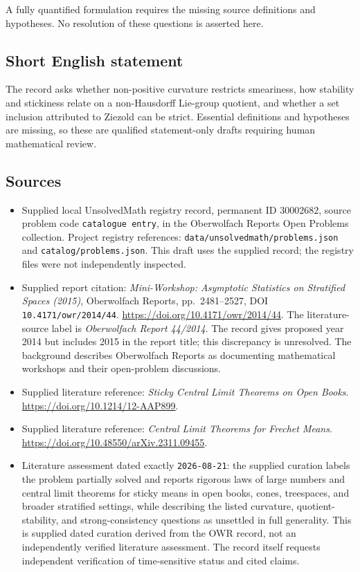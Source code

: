 \documentclass[11pt]{article}
\begin{document}
A fully quantified formulation requires the missing source definitions and hypotheses. No resolution of these questions is asserted here.
\subsection{Short English statement}
The record asks whether non-positive curvature restricts smeariness, how stability and stickiness relate on a non-Hausdorff Lie-group quotient, and whether a set inclusion attributed to Ziezold can be strict. Essential definitions and hypotheses are missing, so these are qualified statement-only drafts requiring human mathematical review.
\subsection{Sources}
\begin{itemize}
\item Supplied local UnsolvedMath registry record, permanent ID \(30002682\), source problem code \texttt{catalogue entry}, in the Oberwolfach Reports Open Problems collection. Project registry references: \texttt{data/unsolvedmath/problems.json} and \texttt{catalog/problems.json}. This draft uses the supplied record; the registry files were not independently inspected.
\item Supplied report citation: \emph{Mini-Workshop: Asymptotic Statistics on Stratified Spaces (2015)}, Oberwolfach Reports, pp.\ 2481--2527, DOI \texttt{10.4171/owr/2014/44}. \url{https://doi.org/10.4171/owr/2014/44}. The literature-source label is \emph{Oberwolfach Report 44/2014}. The record gives proposed year 2014 but includes 2015 in the report title; this discrepancy is unresolved. The background describes Oberwolfach Reports as documenting mathematical workshops and their open-problem discussions.
\item Supplied literature reference: \emph{Sticky Central Limit Theorems on Open Books}. \url{https://doi.org/10.1214/12-AAP899}.
\item Supplied literature reference: \emph{Central Limit Theorems for Frechet Means}. \url{https://doi.org/10.48550/arXiv.2311.09455}.
\item Literature assessment dated exactly \texttt{2026-08-21}: the supplied curation labels the problem partially solved and reports rigorous laws of large numbers and central limit theorems for sticky means in open books, cones, treespaces, and broader stratified settings, while describing the listed curvature, quotient-stability, and strong-consistency questions as unsettled in full generality. This is supplied dated curation derived from the OWR record, not an independently verified literature assessment. The record itself requests independent verification of time-sensitive status and cited claims.

\end{itemize}
\end{document}
